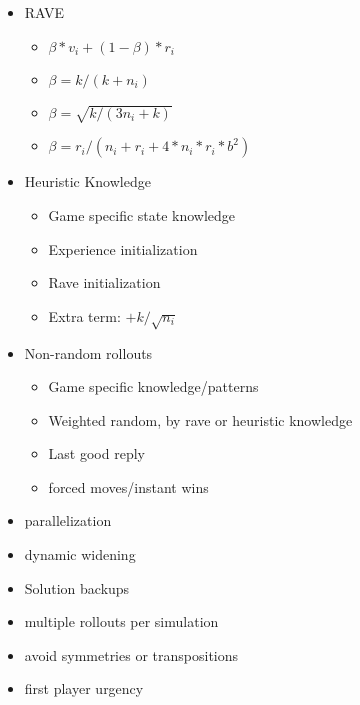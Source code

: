 \begin{itemize}
\item RAVE
	\begin{itemize}
		\item $\beta*v_i + (1-\beta)*r_i$
		\item $\beta = k/(k+n_i)$
		\item $\beta = \sqrt{k/(3n_i+k)}$
		\item $\beta = r_i/(n_i+r_i+4*n_i*r_i*b^2)$
	\end{itemize}
\item Heuristic Knowledge
	\begin{itemize}
		\item Game specific state knowledge
		\item Experience initialization
		\item Rave initialization
		\item Extra term: $ + k/\sqrt{n_i}$
	\end{itemize}
\item Non-random rollouts
	\begin{itemize}
		\item Game specific knowledge/patterns
		\item Weighted random, by rave or heuristic knowledge
		\item Last good reply
		\item forced moves/instant wins
	\end{itemize}
\item parallelization
\item dynamic widening
\item Solution backups
\item multiple rollouts per simulation
\item avoid symmetries or transpositions
\item first player urgency

\end{itemize}















